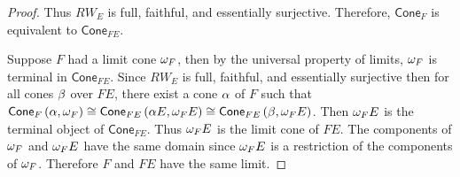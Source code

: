 \documentclass{article}
\begin{document}
\begin{proof}
	   Thus $RW_{E}$ is full, faithful, and essentially surjective. Therefore, 
	   $\mathsf{Cone}_{F}$ is equivalent to  $\mathsf{Cone}_{FE}$. 
	   
	   Suppose $F$ had a limit cone $\omega_{F}$, then by the universal property 
	   of limits, $\omega_{F}$ is terminal in $\mathsf{Cone}_{FE}$. Since $RW_{E}$ 
	   is full, faithful, and essentially surjective then for all cones $\beta$ 
	   over $FE$, there exist a cone $\alpha$ of $F$ such that 
	   $\mathsf{Cone}_{F}\left({\alpha,\omega_{F}}\right) \cong \mathsf{Cone}_{FE}\left({\alpha E, 
	   	\omega_{F} E}\right)  \cong \mathsf{Cone}_{FE}\left({\beta,\omega_{F}E}\right)$. Then 
   	$\omega_{F}E$ is the terminal object of $\mathsf{Cone}_{FE}$. Thus $\omega_{F}E$ 
   	is the limit cone of $FE$. The components of $\omega_{F}$ and $\omega_{F}E$ have 
   	the same domain since $\omega_{F}E$ is a restriction of the components of 
   	$\omega_{F}$. Therefore $F$ and $FE$ have the same limit.
	  	
	\end{proof}
\end{document}
